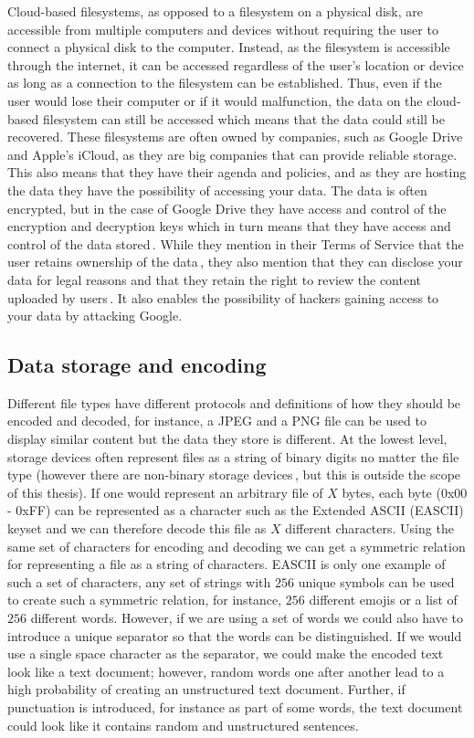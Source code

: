 Cloud-based filesystems, as opposed to a filesystem on a physical disk, are accessible from multiple computers and devices without requiring the user to connect a physical disk to the computer. Instead, as the filesystem is accessible through the internet, it can be accessed regardless of the user's location or device as long as a connection to the filesystem can be established. Thus, even if the user would lose their computer or if it would malfunction, the data on the cloud-based filesystem can still be accessed which means that the data could still be recovered. These filesystems are often owned by companies, such as Google Drive and Apple's iCloud, as they are big companies that can provide reliable storage. This also means that they have their agenda and policies, and as they are hosting the data they have the possibility of accessing your data. The data is often encrypted, but in the case of Google Drive they have access and control of the encryption and decryption keys which in turn means that they have access and control of the data stored\,\cite{johnsonGoogleDriveSecure2021}. While they mention in their Terms of Service that the user retains ownership of the data\,\cite{googleGoogleDriveTerms}, they also mention that they can disclose your data for legal reasons and that they retain the right to review the content uploaded by users\,\cite{googleGoogleTermsService}. It also enables the possibility of hackers gaining access to your data by attacking Google.

\subsection{Data storage and encoding}
\label{sec:data_storage}
Different file types have different protocols and definitions of how they should be encoded and decoded, for instance, a JPEG and a PNG file can be used to display similar content but the data they store is different. At the lowest level, storage devices often represent files as a string of binary digits no matter the file type (however there are non-binary storage devices\,\cite{MultistateDataStorage2020}, but this is outside the scope of this thesis). If one would represent an arbitrary file of $X$ bytes, each byte (0x00 - 0xFF) can be represented as a character such as the Extended ASCII (EASCII) keyset and we can therefore decode this file as $X$ different characters. Using the same set of characters for encoding and decoding we can get a symmetric relation for representing a file as a string of characters. EASCII is only one example of such a set of characters, any set of strings with $256$ unique symbols can be used to create such a symmetric relation, for instance, $256$ different emojis or a list of $256$ different words. However, if we are using a set of words we could also have to introduce a unique separator so that the words can be distinguished. If we would use a single space character as the separator, we could make the encoded text look like a text document; however, random words one after another lead to a high probability of creating an unstructured text document. Further, if punctuation is introduced, for instance as part of some words, the text document could look like it contains random and unstructured sentences.


